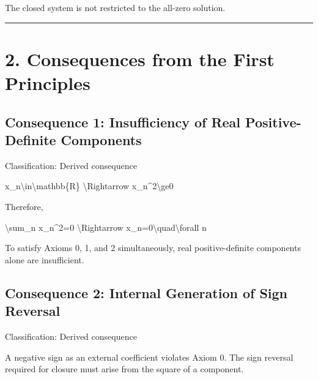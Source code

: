\documentclass[
  a4paper]{article}
\newenvironment{Shaded}{}{}
\newcommand{\NormalTok}[1]{#1}
\begin{document}
The closed system is not restricted to the all-zero solution.

\begin{center}\rule{0.5\linewidth}{0.5pt}\end{center}

\section{2. Consequences from the First
Principles}\label{consequences-from-the-first-principles}

\subsection{Consequence 1: Insufficiency of Real Positive-Definite
Components}\label{consequence-1-insufficiency-of-real-positive-definite-components}

Classification: Derived consequence

\begin{Shaded}
\begin{Highlighting}[]
\NormalTok{x\_n\textbackslash{}in\textbackslash{}mathbb\{R\}}
\NormalTok{\textbackslash{}Rightarrow}
\NormalTok{x\_n\^{}2\textbackslash{}ge0}
\end{Highlighting}
\end{Shaded}

Therefore,

\begin{Shaded}
\begin{Highlighting}[]
\NormalTok{\textbackslash{}sum\_n x\_n\^{}2=0}
\NormalTok{\textbackslash{}Rightarrow}
\NormalTok{x\_n=0\textbackslash{}quad\textbackslash{}forall n}
\end{Highlighting}
\end{Shaded}

To satisfy Axioms 0, 1, and 2 simultaneously, real positive-definite
components alone are insufficient.

\subsection{Consequence 2: Internal Generation of Sign
Reversal}\label{consequence-2-internal-generation-of-sign-reversal}

Classification: Derived consequence

A negative sign as an external coefficient violates Axiom 0. The sign
reversal required for closure must arise from the square of a component.
\end{document}
